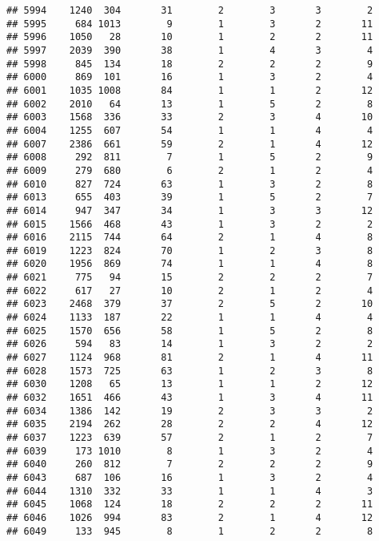 \documentclass[]{article}
\begin{document}
\begin{verbatim}
## 5994    1240  304       31        2        3       3        2
## 5995     684 1013        9        1        3       2       11
## 5996    1050   28       10        1        2       2       11
## 5997    2039  390       38        1        4       3        4
## 5998     845  134       18        2        2       2        9
## 6000     869  101       16        1        3       2        4
## 6001    1035 1008       84        1        1       2       12
## 6002    2010   64       13        1        5       2        8
## 6003    1568  336       33        2        3       4       10
## 6004    1255  607       54        1        1       4        4
## 6007    2386  661       59        2        1       4       12
## 6008     292  811        7        1        5       2        9
## 6009     279  680        6        2        1       2        4
## 6010     827  724       63        1        3       2        8
## 6013     655  403       39        1        5       2        7
## 6014     947  347       34        1        3       3       12
## 6015    1566  468       43        1        3       2        2
## 6016    2115  744       64        2        1       4        8
## 6019    1223  824       70        1        2       3        8
## 6020    1956  869       74        1        1       4        8
## 6021     775   94       15        2        2       2        7
## 6022     617   27       10        2        1       2        4
## 6023    2468  379       37        2        5       2       10
## 6024    1133  187       22        1        1       4        4
## 6025    1570  656       58        1        5       2        8
## 6026     594   83       14        1        3       2        2
## 6027    1124  968       81        2        1       4       11
## 6028    1573  725       63        1        2       3        8
## 6030    1208   65       13        1        1       2       12
## 6032    1651  466       43        1        3       4       11
## 6034    1386  142       19        2        3       3        2
## 6035    2194  262       28        2        2       4       12
## 6037    1223  639       57        2        1       2        7
## 6039     173 1010        8        1        3       2        4
## 6040     260  812        7        2        2       2        9
## 6043     687  106       16        1        3       2        4
## 6044    1310  332       33        1        1       4        3
## 6045    1068  124       18        2        2       2       11
## 6046    1026  994       83        2        1       4       12
## 6049     133  945        8        1        2       2        8

\end{verbatim}
\end{document}
